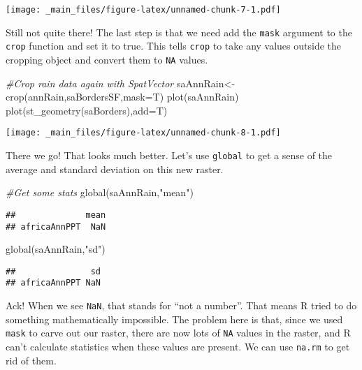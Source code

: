 \documentclass[
]{book}
\newenvironment{Shaded}{\begin{snugshade}}{\end{snugshade}}
\newcommand{\AttributeTok}[1]{\textcolor[rgb]{0.77,0.63,0.00}{#1}}
\newcommand{\CommentTok}[1]{\textcolor[rgb]{0.56,0.35,0.01}{\textit{#1}}}
\newcommand{\FunctionTok}[1]{\textcolor[rgb]{0.00,0.00,0.00}{#1}}
\newcommand{\NormalTok}[1]{#1}
\newcommand{\OtherTok}[1]{\textcolor[rgb]{0.56,0.35,0.01}{#1}}
\newcommand{\StringTok}[1]{\textcolor[rgb]{0.31,0.60,0.02}{#1}}
\begin{document}
\texttt{[image: \_main\_files/figure-latex/unnamed-chunk-7-1.pdf]}

Still not quite there! The last step is that we need add the \texttt{mask} argument to the \texttt{crop} function and set it to true. This tells \texttt{crop} to take any values outside the cropping object and convert them to \texttt{NA} values.

\begin{Shaded}
\begin{Highlighting}[]
\CommentTok{\#Crop rain data again with SpatVector}
\NormalTok{saAnnRain}\OtherTok{\textless{}{-}}\FunctionTok{crop}\NormalTok{(annRain,saBordersSF,}\AttributeTok{mask=}\NormalTok{T)}
\FunctionTok{plot}\NormalTok{(saAnnRain)}
\FunctionTok{plot}\NormalTok{(}\FunctionTok{st\_geometry}\NormalTok{(saBorders),}\AttributeTok{add=}\NormalTok{T)}
\end{Highlighting}
\end{Shaded}

\texttt{[image: \_main\_files/figure-latex/unnamed-chunk-8-1.pdf]}

There we go! That looks much better. Let's use \texttt{global} to get a sense of the average and standard deviation on this new raster.

\begin{Shaded}
\begin{Highlighting}[]
\CommentTok{\#Get some stats}
\FunctionTok{global}\NormalTok{(saAnnRain,}\StringTok{"mean"}\NormalTok{)}
\end{Highlighting}
\end{Shaded}

\begin{verbatim}
##              mean
## africaAnnPPT  NaN
\end{verbatim}

\begin{Shaded}
\begin{Highlighting}[]
\FunctionTok{global}\NormalTok{(saAnnRain,}\StringTok{"sd"}\NormalTok{)}
\end{Highlighting}
\end{Shaded}

\begin{verbatim}
##               sd
## africaAnnPPT NaN
\end{verbatim}

Ack! When we see \texttt{NaN}, that stands for ``not a number''. That means R tried to do something mathematically impossible. The problem here is that, since we used \texttt{mask} to carve out our raster, there are now lots of \texttt{NA} values in the raster, and R can't calculate statistics when these values are present. We can use \texttt{na.rm} to get rid of them.
\end{document}
